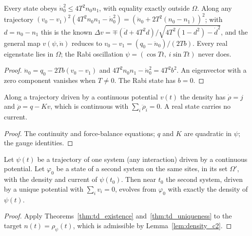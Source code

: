 \begin{theorem}
  \label{thm:dimer}
  \leanok
  Every state obeys $\dot n_0^2\le 4T^2n_0n_1$, with equality exactly outside $\Omega$. Along any trajectory
  $(v_0-v_1)^2(4T^2n_0n_1-\dot n_0^2)=(\ddot n_0+2T^2(n_0-n_1))^2$; with $d=n_0-n_1$ this is the known
  $\Delta v=\mp(\ddot d+4T^2d)/\sqrt{4T^2(1-d^2)-\dot d^2}$, and the general map $v(\psi,\ddot n)$ reduces to
  $v_0-v_1=(q_0-\ddot n_0)/(2Tb)$. Every real eigenstate lies in $\Omega$; the Rabi oscillation
  $\psi=(\cos Tt,\ i\sin Tt)$ never does.
\end{theorem}
\begin{proof}
  \leanok
  $\ddot n_0=q_0-2Tb(v_0-v_1)$ and $4T^2n_0n_1-\dot n_0^2=4T^2b^2$. An eigenvector with a zero component vanishes
  when $T\ne0$. The Rabi state has $b=0$.
\end{proof}



\begin{lemma}
  \label{lem:density_c2}
  \leanok
  Along a trajectory driven by a continuous potential $v(t)$ the density has $\dot\rho=j$ and
  $\ddot\rho=q-Kv$, which is continuous with $\sum_i\ddot\rho_i=0$. A real state carries no current.
\end{lemma}
\begin{proof}
  \leanok
  The continuity and force-balance equations; $q$ and $K$ are quadratic in $\psi$; the gauge identities.
\end{proof}

\begin{theorem}
  \label{thm:van_leeuwen}
  \leanok
  Let $\psi(t)$ be a trajectory of one system (any interaction) driven by a continuous potential. Let
  $\varphi_0$ be a state of a second system on the same sites, in its set $\Omega'$, with the density and current
  of $\psi(t_0)$. Then near $t_0$ the second system, driven by a unique potential with $\sum_iv_i=0$, evolves from
  $\varphi_0$ with exactly the density of $\psi(t)$.
\end{theorem}
\begin{proof}
  \leanok
  Apply Theorems~\ref{thm:td_existence} and~\ref{thm:td_uniqueness} to the target $n(t)=\rho_\psi(t)$, which is
  admissible by Lemma~\ref{lem:density_c2}.
\end{proof}

